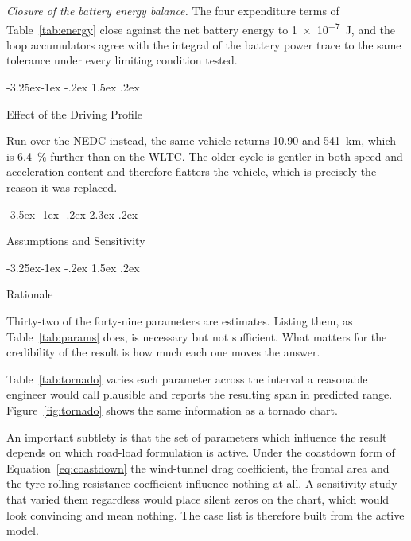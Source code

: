 \documentclass[twocolumn]{article}
\makeatletter
\renewcommand\section{\@startsection{section}{1}{\z@}%
  {-3.5ex \@plus -1ex \@minus -.2ex}%
  {2.3ex \@plus.2ex}%
  {\raggedright\normalfont\Large\bfseries}}
\renewcommand\subsection{\@startsection{subsection}{2}{\z@}%
  {-3.25ex\@plus -1ex \@minus -.2ex}%
  {1.5ex \@plus .2ex}%
  {\raggedright\normalfont\large\bfseries}}
\makeatother
\begin{document}
\emph{Closure of the battery energy balance.} The four expenditure terms of
Table~\ref{tab:energy} close against the net battery energy to
\SI{1e-7}{\joule}, and the loop accumulators agree with the integral of the
battery power trace to the same tolerance under every limiting condition
tested.

\subsection{Effect of the Driving Profile}

Run over the NEDC instead, the same vehicle returns
\SI{10.90}{\kWhph} and
\SI{541}{\kilo\metre}, which is \SI{6.4}{\percent} further than on the WLTC.
The older cycle is gentler in both speed and acceleration content and therefore
flatters the vehicle, which is precisely the reason it was replaced.

\section{Assumptions and Sensitivity}
\label{sec:sensitivity}

\subsection{Rationale}

Thirty-two of the forty-nine parameters are estimates. Listing them, as
Table~\ref{tab:params} does, is necessary but not sufficient. What matters for
the credibility of the result is how much each one moves the answer.

Table~\ref{tab:tornado} varies each parameter across the interval a reasonable
engineer would call plausible and reports the resulting span in predicted
range. Figure~\ref{fig:tornado} shows the same information as a tornado chart.

An important subtlety is that the set of parameters which influence the result
depends on which road-load formulation is active. Under the coastdown form of
Equation~\ref{eq:coastdown} the wind-tunnel drag coefficient, the frontal area
and the tyre rolling-resistance coefficient influence nothing at all. A
sensitivity study that varied them regardless would place silent zeros on the
chart, which would look convincing and mean nothing. The case list is therefore
built from the active model.
\end{document}
